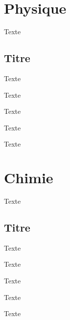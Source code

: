 \documentclass{book}
\begin{document}
\chapter{Physique}

\def\couleurpartie{blue}
\def\nomdepartie{Physique}

Texte

\section{Titre}

Texte

\clearpage

Texte

\clearpage

Texte

\clearpage

Texte

\clearpage

Texte


\chapter{Chimie}

\def\couleurpartie{green!70!black}
\def\nomdepartie{Chimie}

Texte

\section{Titre}

Texte

\clearpage

Texte

\clearpage

Texte

\clearpage

Texte

\clearpage

Texte
\end{document}
